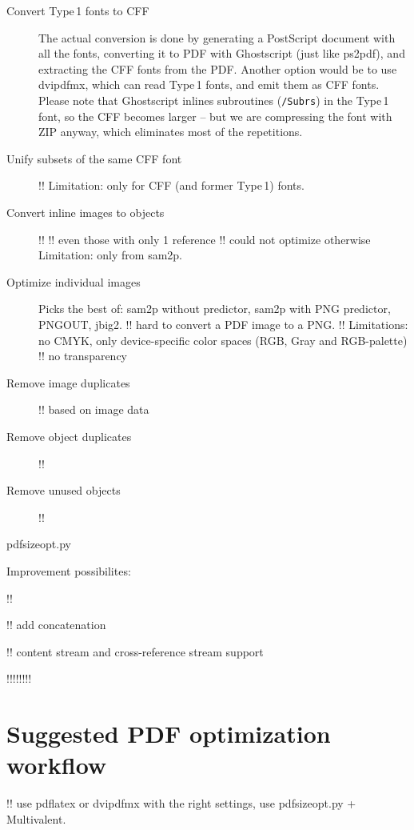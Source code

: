 \documentclass{ltugproc}
\def\cmd{\textsf}
\begin{document}
\begin{description}

\item[Convert Type\,1 fonts to CFF]
The actual conversion is done by generating a PostScript document with all
the fonts, converting it to PDF with Ghostscript (just like \cmd{ps2pdf}),
and extracting the CFF fonts from the PDF. Another option would be to use
\cmd{dvipdfmx}, which can read Type\,1 fonts, and emit them as CFF fonts.
Please note that Ghostscript inlines subroutines (\texttt{/Subrs}) in the
Type\,1 font, so the CFF becomes larger -- but we are compressing the font
with ZIP anyway, which eliminates most of the repetitions.

\item[Unify subsets of the same CFF font]
!!
Limitation: only for CFF (and former Type\,1) fonts.

\item[Convert inline images to objects]
!!
!! even those with only 1 reference
!! could not optimize otherwise
Limitation: only from sam2p.

\item[Optimize individual images]
Picks the best of: \cmd{sam2p} without predictor, \cmd{sam2p} with
PNG predictor, PNGOUT, \cmd{jbig2}.
!! hard to convert a PDF image to a PNG.
!! Limitations: no CMYK, only device-specific color spaces (RGB, Gray and
   RGB-palette)
!! no transparency

\item[Remove image duplicates]
!! based on image data

\item[Remove object duplicates]
!!

\item[Remove unused objects]
!!

\end{description}

\cmd{pdfsizeopt.py}



Improvement possibilites:

!! 

!! add concatenation

!! content stream and cross-reference stream support

!!!!!!!!

\section{Suggested PDF optimization workflow}\label{workflow}
!! use pdflatex or dvipdfmx with the right settings, use pdfsizeopt.py +
   Multivalent.
\end{document}
